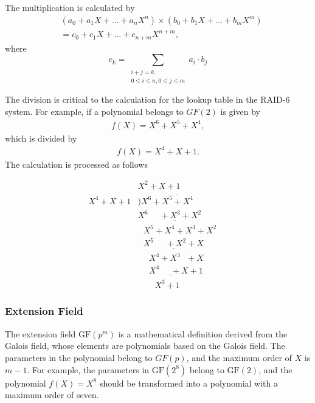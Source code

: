 \documentclass[journal]{IEEEtran}
\begin{document}
The multiplication is calculated by
\begin{align}
  & ({{a}_{0}}+{{a}_{1}}X+...+{{a}_{n}}{{X}^{n}})\times ({{b}_{0}}+{{b}_{1}}X+...+{{b}_{m}}{{X}^{m}}) \nonumber\\ 
 & ={{c}_{0}}+{{c}_{1}}X+...+{{c}_{n+m}}{{X}^{n+m}},
\end{align}
where
\begin{equation}
{{c}_{k}}=\sum\limits_{\begin{smallmatrix} 
 i+j=k, \\ 
 0\le i\le n,0\le j\le m 
\end{smallmatrix}}{{{a}_{i}}\cdot {{b}_{j}}}
\end{equation}


The division is critical to the calculation for the lookup table in the RAID-6 system. For example, if a polynomial belongs to $GF(2)$ is given by 
\begin{align}
    f(X)={{X}^{6}}+{{X}^{5}}+{{X}^{4}},
\end{align}
which is divided by 
\begin{align}
    f(X)={{X}^{4}}+X+1.
\end{align}
The calculation is processed as follows

$$
\begin{array}{lr} 
&X^2+X+1 \\ 
X^4+X+1  \!\!\!\!\!\! & \overline{)X^6 + X^5 + X^4  \text{\ \ \ \ \ \ \ } \text{\ \ \ \ \ \ \ }\text{\ \ \ \ \ \ \ } \text{\ \ \ \ \ \ \ }} \\ 
& \underline{X^6 \text{\ \ \ \ \ \ \ }\text{\ \ \ \ \ \ \ }+X^3+X^2 \text{\ \ \ \ \ \ \ }\text{\ \ \ \ \ \ \ } } \\ 
& {\text{\ \ \ \ \ \ \ } X^5+X^4+X^3+X^2\text{\ \ \ \ \ \ \ }\text{\ \ \ \ \ \ \ }}\\
& \underline{\text{\ \ \ \ \ \ \ } X^5 \text{\ \ \ \ \ \ \ }\text{\ \ \ \ \ \ \ }+X^2+X\text{\ \ \ \ \ \ \ }}\\
&{\text{\ \ \ \ \ \ \ }\text{\ \ \ \ \ \ \ }X^4+X^3\text{\ \ \ \ \ \ \ }+X\text{\ \ \ \ \ \ \ }}\\
&\underline{\text{\ \ \ \ \ \ \ }\text{\ \ \ \ \ \ \ }X^4\text{\ \ \ \ \ \ \ }\text{\ \ \ \ \ \ \ }+X+1}\\
&{\text{\ \ \ \ \ \ \ }\text{\ \ \ \ \ \ \ }\text{\ \ \ \ \ \ \ }X^3+1}
\end{array}
$$

\subsubsection{Extension Field}
The extension field $\text{GF}({{p}^{m}})$ is a mathematical definition derived from the Galois field, whose elements are polynomials based on the Galois field. The parameters in the polynomial belong to $GF(p)$, and the maximum order of $X$ is $m-1$. For example, the parameters in $\text{GF}({{2}^{8}})$ belong to $\text{GF}(2)$, and the polynomial $f(X)={{X}^{8}}$ should be transformed into a polynomial with a maximum order of seven. 
\end{document}
